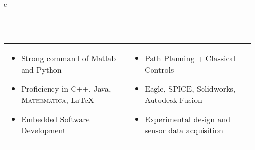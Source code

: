 \documentclass[11pt]{amsart}
\newcommand*\ruleline[1]{\par\noindent\raisebox{.8ex}{\makebox[\linewidth]{\hrulefill\hspace{1ex}\raisebox{-.8ex}{\Large~#1~}\hspace{1ex}\hrulefill}}\\ \-\ \vspace{-1em}}
\begin{document}
\begin{center}
\begin{tabular}{c}
	\ruleline{Skills}
	\begin{minipage}{\textwidth}
	\vspace{-1em}
	\begin{tabular}{p{}p{\dimexpr .5\textwidth-2\tabcolsep}}
			\begin{itemize}[leftmargin=*]
				\item Strong command of Matlab and Python
				\item Proficiency in C++, Java, \textsc{Mathematica}, \LaTeX
				\item Embedded Software Development
			\end{itemize}
		&
			\begin{itemize}[leftmargin=*]
				\item Path Planning + Classical Controls
				\item Eagle, SPICE, Solidworks, Autodesk Fusion
				\item Experimental design and sensor data acquisition
			\end{itemize}
	\end{tabular}
	\end{minipage}\\~ \vspace{-2em}\\
	

\end{tabular}
\end{center}
\end{document}
